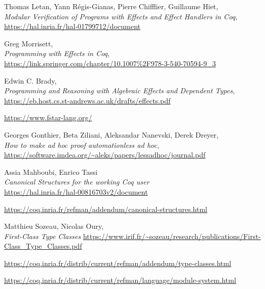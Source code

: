 \documentclass[declaration,inz,english,shortabstract]{iithesis}
\begin{document}
\begin{thebibliography}{1}
        Thomas Letan, Yann Régis-Gianas, Pierre Chifflier, Guillaume Hiet, \\
        \textit{Modular Verification of Programs with Effects and Effect Handlers in Coq}, \\
        \url{https://hal.inria.fr/hal-01799712/document}

        Greg Morrisett, \\
        \textit{Programming with Effects in Coq}, \\
        \url{https://link.springer.com/chapter/10.1007%2F978-3-540-70594-9_3}

        Edwin C. Brady, \\
        \textit{Programming and Reasoning with Algebraic Effects and Dependent Types}, \\
        \url{https://eb.host.cs.st-andrews.ac.uk/drafts/effects.pdf}

        \url{https://www.fstar-lang.org/}

        Georges Gonthier, Beta Ziliani, Aleksandar Nanevski, Derek Dreyer, \\
        \textit{How to make ad hoc proof automationless ad hoc}, \\
        \url{https://software.imdea.org/~aleks/papers/lessadhoc/journal.pdf}

        Assia Mahboubi, Enrico Tassi \\
        \textit{Canonical Structures for the working Coq user} \\
        \url{https://hal.inria.fr/hal-00816703v2/document}

        \url{https://coq.inria.fr/refman/addendum/canonical-structures.html}
    
        Matthieu Sozeau, Nicolas Oury, \\
        \textit{First-Class Type Classes}
        \url{https://www.irif.fr/~sozeau/research/publications/First-Class_Type_Classes.pdf}

        \url{https://coq.inria.fr/distrib/current/refman/addendum/type-classes.html}
    

        \url{https://coq.inria.fr/distrib/current/refman/language/module-system.html}
\end{thebibliography}

\end{document}
